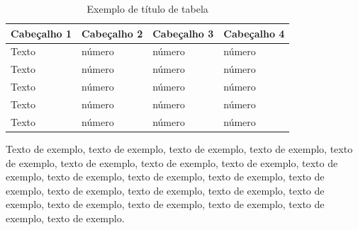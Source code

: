 \documentclass[
	12pt,				%
	oneside,			%
	a4paper,			%
	english,			%
	brazil				%
	]{abntex2ppgsi}
\begin{document}
% 
%
%
%
%
\begin{table}[htbp]
	\centering
	\caption{Exemplo de título de tabela}
		\begin{tabular}{p{1in} p{1in} p{1in} p{1in} } \hline

		Cabeçalho 1	& Cabeçalho 2	& Cabeçalho 3	& Cabeçalho 4 \\ \hline
		Texto	& número & número	& número \\ 
		Texto	& número & número	& número \\ 
		Texto	& número & número	& número \\ 
		Texto	& número & número	& número \\ 
		Texto	& número & número	& número \\ \hline
		
		\end{tabular}
	\label{tab:ExemploDeTabela1}
\end{table}

Texto de exemplo, texto de exemplo, texto de exemplo, texto de exemplo, texto de exemplo, texto de exemplo, texto de exemplo, texto de exemplo, texto de exemplo, texto de exemplo, texto de exemplo, texto de exemplo, texto de exemplo, texto de exemplo, texto de exemplo, texto de exemplo, texto de exemplo, texto de exemplo, texto de exemplo, texto de exemplo, texto de exemplo, texto de exemplo.
\end{document}
